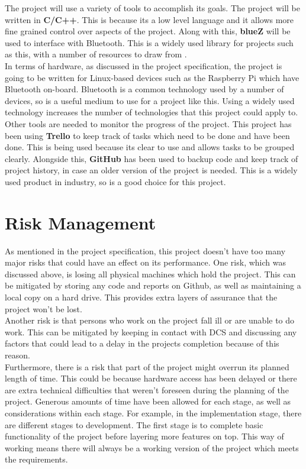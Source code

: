 \documentclass{report}
\begin{document}
The project will use a variety of tools to accomplish its goals. The project will be written in \textbf{C/C++}. This is because its a low level language and it allows more fine grained control over aspects of the project. Along with this, \textbf{blueZ} will be used to interface with Bluetooth. This is a widely used library for projects such as this, with a number of resources to draw from \cite{huang2007bluetooth}.
\bigskip\\
In terms of hardware, as discussed in the project specification, the project is going to be written for Linux-based devices such as the Raspberry Pi which have 
Bluetooth on-board. Bluetooth is a common technology used by a number of devices, so is a useful medium to use for a project like this. Using a widely used technology increases the number of technologies that this project could apply to. 
\bigskip\\
Other tools are needed to monitor the progress of the project. This project has been using \textbf{Trello} to keep track of tasks which need to be done and have been done. This is being used because its clear to use and allows tasks to be grouped clearly. Alongside this, \textbf{GitHub} has been used to backup code and keep track of project history, in case an older version of the project is needed. This is a widely used product in industry, so is a good choice for this project.

\section{Risk Management}

As mentioned in the project specification, this project doesn't have too many major risks that could have an effect on its performance. One risk, which was discussed above, is losing all physical machines which hold the project. This can be mitigated by storing any code and reports on Github, as well as maintaining a local copy on a hard drive. This provides extra layers of assurance that the project won't be lost. 
\bigskip\\
Another risk is that persons who work on the project fall ill or are unable to do work. This can be mitigated by keeping in contact with DCS and discussing any factors that could lead to a delay in the projects completion because of this reason.
\bigskip\\
Furthermore, there is a risk that part of the project might overrun its planned length of time. This could be because hardware access has been delayed or there are extra technical difficulties that weren't foreseen during the planning of the project. Generous amounts of time have been allowed for each stage, as well as considerations within each stage. For example, in the implementation stage, there are different stages to development. The first stage is to complete basic functionality of the project before layering more features on top. This way of working means there will always be a working version of the project which meets the requirements.
\end{document}
